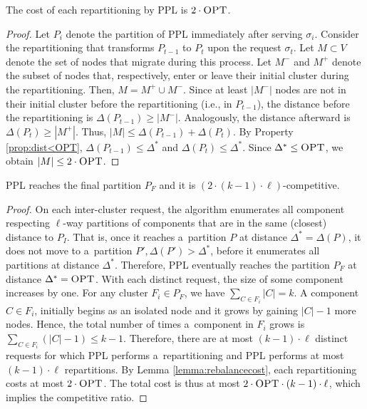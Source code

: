 \documentclass[a4paper,anonymous,USenglish]{lipics-v2019}
\newcommand{\OPT}{\textsc{OPT}\xspace}
\newcommand{\PPL}{\textsc{PPL}\xspace}
\begin{document}
\begin{lemma}	\label{lemma:rebalancecost}
	The cost of each repartitioning by \PPL is $2\cdot\OPT$.
\end{lemma}
\begin{proof}
	Let $P_i$ denote the partition of \PPL immediately after serving $\sigma_{i}$.
	Consider the repartitioning that transforms 
	$P_{t-1}$ to $P_t$ upon the request $\sigma_t$.
	Let $M \subset V$ denote the set of nodes that migrate during this process.
	Let $M^-$ and $M^+$ denote the subset of nodes that, respectively,
	enter or leave their initial cluster during the repartitioning.    
	Then,
	$M = M^+ \cup M^-$.
	Since at least $|M^-|$ nodes are not in their initial cluster before the repartitioning (i.e., in $P_{t-1}$),
	the distance before the repartitioning is $\Delta(P_{t-1}) \geq | M^-|$.
	Analogously,
	the distance afterward is $\Delta(P_{t}) \geq | M^+|$.
	Thus,
	$|M| \leq \Delta(P_{t-1}) + \Delta(P_{t})$.
	By Property \ref{prop:dist<OPT},
	$\Delta(P_{t-1})  \leq \Delta^*$ and
	$\Delta(P_{t}) \leq \Delta^*$.
	Since $\Delta^* \leq \OPT$,
	we obtain	 $|M| \leq 2\cdot\OPT$.
\end{proof}

\begin{theorem}	\label{thm:upperbound}
	\PPL reaches the final partition $P_F$
	 and it is $(2\cdot (k-1)\cdot\ell)$-competitive.
\end{theorem}
\begin{proof}
	On each inter-cluster request,
	the algorithm enumerates all component respecting $\ell$-way partitions of components
	that are in the same (closest) distance to $P_I$.
	That is, 
	once it reaches a~partition $P$ at distance $\Delta^* = \Delta(P)$,
	it does not move to a~partition
	$P', \Delta(P') > \Delta^*$,
	before it enumerates all partitions at distance $\Delta^*$.
	Therefore,
	\PPL eventually reaches  the partition $P_F$ at distance $\Delta^*=\OPT$.
	With each distinct request, 
	the size of some component increases by one.
	For any cluster $F_i \in P_F$,
	we have $\sum_{C \in F_i} |C| = k$.
	A component $C \in F_i$,
	 initially begins as an isolated node and it grows by gaining $|C|-1$ more nodes.
	Hence, the total number of times a~component in $F_i$ grows is 
	$\sum_{C \in F_i} (|C|-1) \leq k-1$.
	Therefore, there are at most  $(k-1)\cdot\ell $ distinct requests
	for which \PPL performs a~repartitioning and
	 \PPL performs at most $(k-1)\cdot\ell $ repartitions.
	By Lemma \ref{lemma:rebalancecost},
	each repartitioning costs at most $2\cdot\OPT$.
	The total cost is thus at most $2\cdot\OPT\cdot (k-1) \cdot\ell$, which implies the competitive ratio.
\end{proof}
\end{document}
